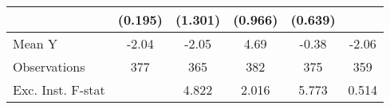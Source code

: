 {\begin{tabular}{l*{5}{c}}
            &     (0.195)         &     (1.301)         &     (0.966)         &     (0.639)         &                     \\
\midrule
Mean Y      &       -2.04         &       -2.05         &        4.69         &       -0.38         &       -2.06         \\
Observations&         377         &         365         &         382         &         375         &         359         \\
Exc. Inst. F-stat&                     &       4.822         &       2.016         &       5.773         &       0.514         \\
\bottomrule
\end{tabular}
}
